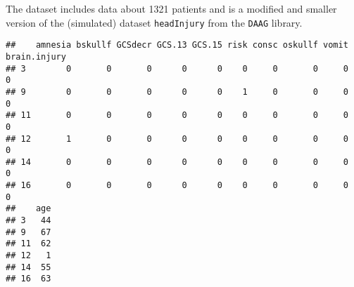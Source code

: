 \documentclass[10pt,ignorenonframetext,]{beamer}
\begin{document}
\begin{frame}[fragile]

The dataset includes data about 1321 patients and is a modified and
smaller version of the (simulated) dataset \texttt{headInjury} from the
\texttt{DAAG} library.

\scriptsize

\begin{verbatim}
##    amnesia bskullf GCSdecr GCS.13 GCS.15 risk consc oskullf vomit brain.injury
## 3        0       0       0      0      0    0     0       0     0            0
## 9        0       0       0      0      0    1     0       0     0            0
## 11       0       0       0      0      0    0     0       0     0            0
## 12       1       0       0      0      0    0     0       0     0            0
## 14       0       0       0      0      0    0     0       0     0            0
## 16       0       0       0      0      0    0     0       0     0            0
##    age
## 3   44
## 9   67
## 11  62
## 12   1
## 14  55
## 16  63
\end{verbatim}

\normalsize

\end{frame}
\end{document}
